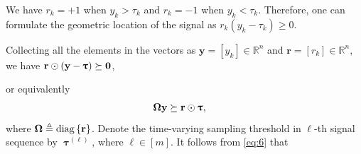 \documentclass[12pt,draftcls,onecolumn]{IEEEtran}
\begin{document}
We have $r_{k}=+1$ when $y_{k}>\tau_{k}$ and $r_{k}=-1$ when $y_{k}<\tau_{k}$. Therefore, one can formulate the geometric location of the signal as
$r_{k}\left(y_{k}-\tau_{k}\right) \geq 0$.

Collecting all the elements in the vectors as $\mathbf{y}=[y_{k}] \in \mathbb{R}^{n}$ and $\mathbf{r}=[r_{k}] \in \mathbb{R}^{n}$, we have
$\mathbf{r}\odot\left(\mathbf{y}-\boldsymbol{\uptau}\right) \succeq \mathbf{0}$,

or equivalently
\begin{equation}
\label{eq:6}
\begin{aligned}
\bOmega \mathbf{y} &\succeq \mbr \odot \boldsymbol{\uptau},
\end{aligned}
\end{equation}
where $\boldsymbol{\Omega} \triangleq \operatorname{diag}\left\{\mathbf{r}\right\}$. Denote the time-varying sampling threshold in $\ell$-th  signal sequence by $\boldsymbol{\uptau}^{(\ell)}$, where  $\ell\in [m]$.
It follows from \eqref{eq:6} that
\end{document}
